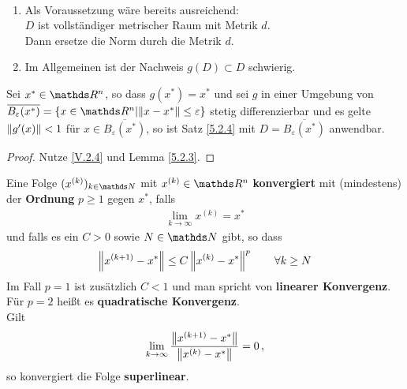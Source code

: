 \begin{Beme}
  \label{5.2.5}~
  \begin{enumerate}[1)]
  \item Als Voraussetzung wäre bereits ausreichend:\\
    $D$ ist vollständiger metrischer Raum mit Metrik $d$. \\
    Dann ersetze die Norm durch die Metrik $d$.
  \item Im Allgemeinen ist der Nachweis $g(D)\subset D$ schwierig.
  \end{enumerate}
\end{Beme}



\begin{Fole}
  \label{5.2.6}
  Sei $x^{*}\in \R^n$, so dass $g(x^{*})=x^{*}$ und sei $g$ in einer Umgebung von 
  $\overline{B_\varepsilon(x^{*})}=\left\{ x\in \R^n \middle\vert \nn[x-x^{*}]\leq \varepsilon \right\}$
  stetig differenzierbar und es gelte $\nn[g'(x)]<1$ für $x\in \overline{B_\varepsilon(x^{*})}$,
  so ist Satz \ref{5.2.4} mit $D=\overline{B_\varepsilon(x^{*})}$ anwendbar.
\end{Fole}

\begin{proof}
  Nutze \eqref{V.2.4} und Lemma \ref{5.2.3}.
\end{proof}


\begin{Defe}
  \label{5.3.1}
  Eine Folge $(x^{(k)})_{k\in\N} $ mit $x^{(k)}\in\R^n$ \textbf{konvergiert} mit (mindestens)
  der \textbf{Ordnung} $p\geq 1$ gegen $x^{*}$, falls
  \begin{gather*}
    \lim\limits_{k\rightarrow \infty}x^{(k)}=x^{*}
  \end{gather*}
  und falls es ein $C>0$ sowie $N\in\N$ gibt, so dass
  \begin{gather*}
    \nn[x^{(k+1)}-x^{*}] \leq C \nn[x^{(k)}-x^{*}]^p\qquad \forall k\geq N 
  \end{gather*}
  Im Fall $p=1$ ist zusätzlich $C<1$ und man spricht von \textbf{linearer Konvergenz}. \\
  Für $p=2$ heißt es \textbf{quadratische Konvergenz}.
  \\Gilt 
  \begin{gather*} 
    \lim\limits_{k\rightarrow \infty}\frac{\nn[x^{(k+1)}-x^{*}]}{\nn[x^{(k)}-x^{*}]} = 0\, ,
  \end{gather*} so konvergiert die Folge \textbf{superlinear}.
\end{Defe}


